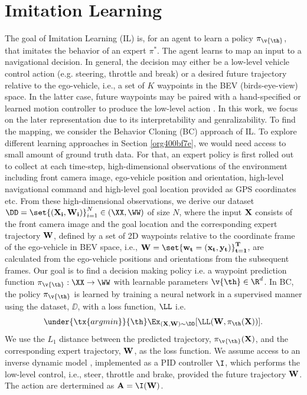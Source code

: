 \documentclass[letterpaper, 12pt]{book}
\theoremstyle{definition}
\theoremstyle{definition}
\theoremstyle{definition}
\theoremstyle{definition}
\theoremstyle{definition}
\begin{document}
\section{Imitation Learning \label{orgfb4519e}}
\label{sec:org605fa33}
The goal of Imitation Learning (IL) is, for an agent to learn a policy
\(\pi_{\v{\th}}\), that imitates the behavior of an expert \(\pi^{*}\). The
agent learns to map an input to a navigational decision. In general, the
decision may either be a low-level vehicle control action
\cite{Codevilla2019} (e.g. steering, throttle and break) or a desired future
trajectory relative to the ego-vehicle, i.e., a set of \(K\) waypoints
\cite{Chen2019,Mueller2018} in the BEV (birds-eye-view) space. In the latter
case, future waypoints may be paired with a hand-specified or learned motion
controller to produce the low-level action \cite{Chen2019,Mueller2018}. In
this work, we focus on the later representation due to its interpretability
and genralizability. To find the mapping, we consider the Behavior Cloning
(BC) approach of IL. To explore different learning approaches in Section
\ref{org400bf7e}, we would need access to small amount of ground truth
data. For that, an expert policy is first rolled out to collect at each
time-step, high-dimensional observations of the environment including front
camera image, ego-vehicle position and orientation, high-level navigational
command and high-level goal location provided as GPS coordinates etc. From
these high-dimensional observations, we derive our dataset \(\DD = \set{(\bf
   X_{i}, \bf W_{i})}_{i=1}^{N}\in(\XX,\WW)\) of size \(N\), where the input
\(\bf X\) consists of the front camera image and the goal location and the
corresponding expert trajectory \(\bf W\), defined by a set of 2D waypoints
relative to the coordinate frame of the ego-vehicle in BEV space, i.e., \(\bf
   W=\set{\bf w_{t}=(x_{t},y_{t})}_{t=1}^{T}\), are calculated from the
ego-vehicle positions and orientations from the subsequent frames. Our goal
is to find a decision making policy i.e. a waypoint prediction function
\(\pi_{\v{\th}}:\XX\to\WW\) with learnable parameters
\(\v{\th}\in\R^{d}\). In BC, the policy \(\pi_{\v{\th}}\) is learned by
training a neural network in a supervised manner using the dataset, \(\DD\),
with a loss function, \(\LL\) i.e.  \[\under{\tx{argmin }}{{\th}} \Ex_{(\bf
   X,\bf W)\sim \DD} [\LL(\bf W,\pi_{\th}(\bf X))].\] We use the \(L_{1}\)
distance between the predicted trajectory, \(\pi_{\v{\th}}(\bf X)\), and the
corresponding expert trajectory, \(\bf W\), as the loss function. We assume
access to an inverse dynamic model \cite{10.2307/j.ctt183ph6v}, implemented
as a PID controller \(\I\), which performs the low-level control, i.e.,
steer, throttle and brake, provided the future trajectory \(\bf W\). The
action are dertermined as \(\bf A=\I(\bf W)\).
\end{document}

